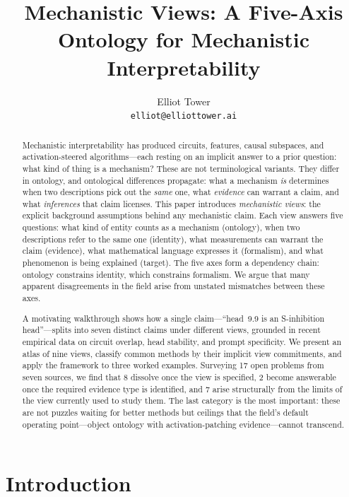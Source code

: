 \documentclass{article}
\title{Mechanistic Views: A Five-Axis Ontology for Mechanistic Interpretability}
\author{
Elliot Tower \\
\texttt{elliot@elliottower.ai}
}
\begin{document}
\maketitle

\begin{abstract}
Mechanistic interpretability has produced circuits, features, causal
subspaces, and activation-steered algorithms---each resting on an
implicit answer to a prior question: what kind of thing is a mechanism?
These are not terminological variants.  They differ in ontology, and
ontological differences propagate: what a mechanism \emph{is} determines
when two descriptions pick out the \emph{same} one, what \emph{evidence}
can warrant a claim, and what \emph{inferences} that claim licenses.
This paper introduces \emph{mechanistic views}: the explicit background
assumptions behind any mechanistic claim.  Each view answers five
questions: what kind of entity counts as a mechanism (ontology), when
two descriptions refer to the same one (identity), what measurements
can warrant the claim (evidence), what mathematical language expresses
it (formalism), and what phenomenon is being explained (target).
The five axes form a dependency chain: ontology constrains identity,
which constrains formalism.  We argue that many apparent disagreements
in the field arise from unstated mismatches between these axes.

A motivating walkthrough shows how a single claim---``head~9.9
is an S-inhibition head''---splits into seven distinct claims under
different views, grounded in recent empirical data on circuit overlap,
head stability, and prompt specificity.
We present an atlas of nine views, classify common methods by their
implicit view commitments, and apply the framework to three worked
examples.  Surveying 17 open problems from seven sources, we find that
8 dissolve once the view is specified, 2 become answerable once the
required evidence type is identified, and 7 arise structurally from the
limits of the view currently used to study them.
The last category is the most important: these are not puzzles waiting
for better methods but ceilings that the field's default operating
point---object ontology with activation-patching evidence---cannot
transcend.
\end{abstract}


\section{Introduction}
\end{document}
